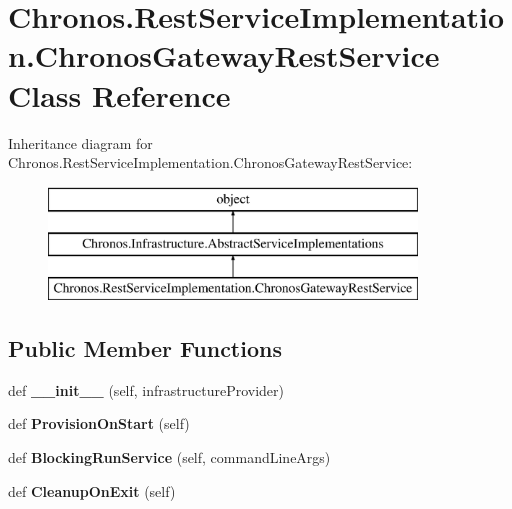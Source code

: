 \hypertarget{classChronos_1_1RestServiceImplementation_1_1ChronosGatewayRestService}{}\section{Chronos.\+Rest\+Service\+Implementation.\+Chronos\+Gateway\+Rest\+Service Class Reference}
\label{classChronos_1_1RestServiceImplementation_1_1ChronosGatewayRestService}
Inheritance diagram for Chronos.\+Rest\+Service\+Implementation.\+Chronos\+Gateway\+Rest\+Service\+:\begin{figure}[H]
\begin{center}
\leavevmode
\includegraphics[height=3.000000cm]{classChronos_1_1RestServiceImplementation_1_1ChronosGatewayRestService}
\end{center}
\end{figure}
\subsection*{Public Member Functions}
\begin{DoxyCompactItemize}
\item 
def {\bfseries \+\_\+\+\_\+init\+\_\+\+\_\+} (self, infrastructure\+Provider)\hypertarget{classChronos_1_1RestServiceImplementation_1_1ChronosGatewayRestService_a25ffdb9ffe2d95459ec58fd159b2a5bf}{}\label{classChronos_1_1RestServiceImplementation_1_1ChronosGatewayRestService_a25ffdb9ffe2d95459ec58fd159b2a5bf}

\item 
def {\bfseries Provision\+On\+Start} (self)\hypertarget{classChronos_1_1RestServiceImplementation_1_1ChronosGatewayRestService_a55fed10639ef6757976695b04cc296c3}{}\label{classChronos_1_1RestServiceImplementation_1_1ChronosGatewayRestService_a55fed10639ef6757976695b04cc296c3}

\item 
def {\bfseries Blocking\+Run\+Service} (self, command\+Line\+Args)\hypertarget{classChronos_1_1RestServiceImplementation_1_1ChronosGatewayRestService_a889cec64ed641b67dffb36898cd9a774}{}\label{classChronos_1_1RestServiceImplementation_1_1ChronosGatewayRestService_a889cec64ed641b67dffb36898cd9a774}

\item 
def {\bfseries Cleanup\+On\+Exit} (self)\hypertarget{classChronos_1_1RestServiceImplementation_1_1ChronosGatewayRestService_abd0bc0a426b1868ff173f22f8795fd5e}{}\label{classChronos_1_1RestServiceImplementation_1_1ChronosGatewayRestService_abd0bc0a426b1868ff173f22f8795fd5e}

\end{DoxyCompactItemize}
